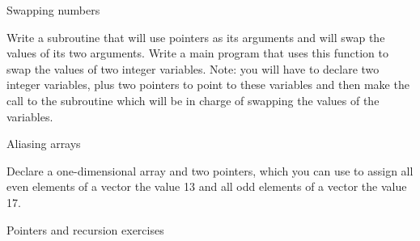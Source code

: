  {Swapping numbers}
\label{ex:pointer-swap}

Write a subroutine that will use pointers as its arguments and will swap the
values of its two arguments. Write a main program that uses this function to
swap the values of two integer variables. Note: you will have to declare two
integer variables, plus two pointers to point to these variables and then make
the call to the subroutine which will be in charge of swapping the values of the
variables.


 {Aliasing arrays}
\label{ex:pointer-alias-arrays}

Declare a one-dimensional array and two pointers, which you can use to assign
all even elements of a vector the value 13 and all odd elements of a vector the
value 17.  



 {Pointers and recursion exercises}
\label{sec:pointers-recursion-exercises}



